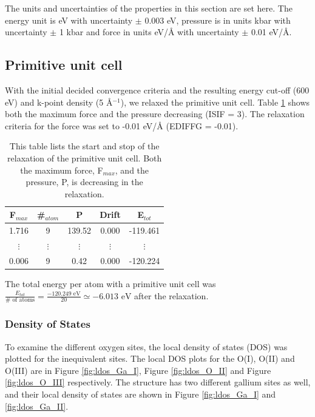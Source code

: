 The units and uncertainties of the properties in this section are set here. The energy unit is eV with uncertainty $\pm$ 0.003 eV, pressure is in units kbar with uncertainty $\pm$ 1 kbar and force in units eV/Å with uncertainty $\pm$ 0.01 eV/Å.


\subsection{Primitive unit cell}

With the initial decided convergence criteria and the resulting energy cut-off (600 eV) and k-point density (5 Å$^{-1}$), we relaxed the primitive unit cell. Table \ref{tab:ionstep_primitive} shows both the maximum force and the pressure decreasing (ISIF = 3). The relaxation criteria for the force was set to -0.01 eV/Å (EDIFFG = -0.01).

\begin{table}[H]\caption{This table lists the start and stop of the relaxation of the primitive unit cell. Both the maximum force, F$_{max}$, and the pressure, P, is decreasing in the relaxation.}\label{tab:ionstep_primitive}
\begin{tabular}{ccccc}
F$_{max}$ &\#$_{atom}$&	P&	Drift&	E$_{tot}$\\ \hline
1.716&	9&	139.52&	0.000&	-119.461\\
$\vdots$&$\vdots$&$\vdots$&$\vdots$&$\vdots$\\
0.006&	9&	0.42&	0.000&	-120.224\\
\end{tabular}
\end{table}

The total energy per atom with a primitive unit cell was $\frac{E_{tot}}{\# \text{ of atoms}} = \frac{-120.249 \text{ eV}}{20} \simeq -6.013 \text{ eV}$ after the relaxation.

\subsubsection{Density of States}

To examine the different oxygen sites, the local density of states (DOS) was plotted for the inequivalent sites. The local DOS plots for the O(I), O(II) and O(III) are in Figure \ref{fig:ldos_Ga_I}, Figure \ref{fig:ldos_O_II} and Figure \ref{fig:ldos_O_III} respectively. The structure has two different gallium sites as well, and their local density of states are shown in Figure \ref{fig:ldos_Ga_I} and \ref{fig:ldos_Ga_II}.

